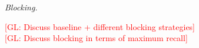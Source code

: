 \documentclass{article}
\newcommand{\glnote}[1]{\textcolor{red}{[GL: #1]}}
\newcommand{\msnote}[1]{\textcolor{blue}{[MS: #1]}}
\begin{document}

\textit{Blocking.}

\glnote{Discuss baseline + different blocking strategies}\\
\glnote{Discuss blocking in terms of maximum recall}


\end{document}
